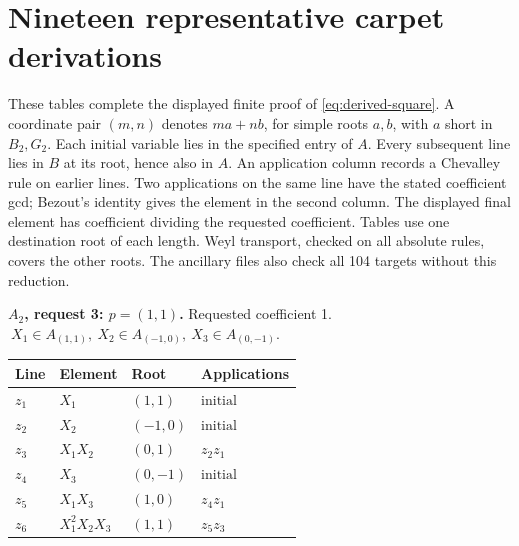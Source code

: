 \section{Nineteen representative carpet derivations}
\label{app:carpet-tables}
These tables complete the displayed finite proof of
\eqref{eq:derived-square}. A coordinate pair \((m,n)\) denotes
\(ma+nb\), for simple roots \(a,b\), with \(a\) short in \(B_2,G_2\).
Each initial variable lies in the specified entry of \(A\).
Every subsequent line lies in \(B\) at its root, hence also in \(A\).
An application column records a Chevalley rule on earlier lines.
Two applications on the same line have the stated coefficient gcd;
Bezout's identity gives the element in the second column.
The displayed final element has coefficient dividing the requested
coefficient. Tables use one destination root of each length.
Weyl transport, checked on all absolute rules, covers the other roots.
The ancillary files also check all 104 targets without this reduction.
\par\medskip\noindent\begin{minipage}{\textwidth}
\textbf{\(A_2\), request 3: \(p=(1,1)\).} Requested coefficient 1.
\(\ X_1\in A_{(1,1)},\ X_2\in A_{(-1,0)},\ X_3\in A_{(0,-1)}.\)\par
\smallskip\centering\small\begin{tabular}{@{}llll@{}}\toprule
Line & Element & Root & Applications\\\midrule
\(z_{1}\) & \(X_1\) & \((1,1)\) & \(\text{initial}\) \\
\(z_{2}\) & \(X_2\) & \((-1,0)\) & \(\text{initial}\) \\
\(z_{3}\) & \(X_1X_2\) & \((0,1)\) & \(z_{2}z_{1}\) \\
\(z_{4}\) & \(X_3\) & \((0,-1)\) & \(\text{initial}\) \\
\(z_{5}\) & \(X_1X_3\) & \((1,0)\) & \(z_{4}z_{1}\) \\
\(z_{6}\) & \(X_1^{2}X_2X_3\) & \((1,1)\) & \(z_{5}z_{3}\) \\
\bottomrule\end{tabular}\end{minipage}\par
